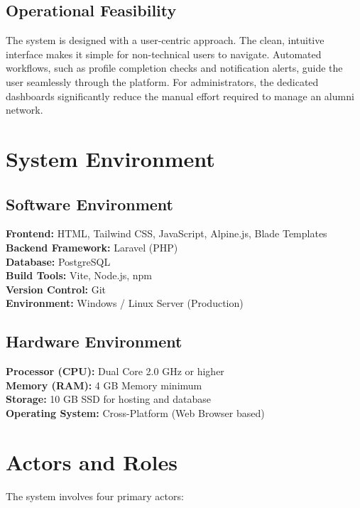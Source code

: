 \subsection{Operational Feasibility}
The system is designed with a user-centric approach. The clean, intuitive interface makes it simple for non-technical users to navigate. Automated workflows, such as profile completion checks and notification alerts, guide the user seamlessly through the platform. For administrators, the dedicated dashboards significantly reduce the manual effort required to manage an alumni network.

\section{System Environment}
 
\subsection{Software Environment}
\textbf{Frontend:} HTML, Tailwind CSS, JavaScript, Alpine.js, Blade Templates \\
\textbf{Backend Framework:} Laravel (PHP) \\
\textbf{Database:} PostgreSQL \\
\textbf{Build Tools:} Vite, Node.js, npm \\
\textbf{Version Control:} Git \\
\textbf{Environment:} Windows / Linux Server (Production)

\subsection{Hardware Environment}
\textbf{Processor (CPU):} Dual Core 2.0 GHz or higher \\
\textbf{Memory (RAM):} 4 GB Memory minimum \\
\textbf{Storage:} 10 GB SSD for hosting and database \\
\textbf{Operating System:} Cross-Platform (Web Browser based)

\section{Actors and Roles}
The system involves four primary actors: \\

